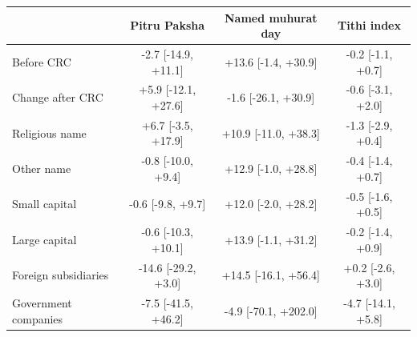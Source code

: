 \begin{tabular}{lccc}
\toprule
 & Pitru Paksha & Named muhurat day & Tithi index \\
\midrule
Before CRC & -2.7 [-14.9, +11.1] & +13.6 [-1.4, +30.9] & -0.2 [-1.1, +0.7] \\
Change after CRC & +5.9 [-12.1, +27.6] & -1.6 [-26.1, +30.9] & -0.6 [-3.1, +2.0] \\
\midrule
Religious name & +6.7 [-3.5, +17.9] & +10.9 [-11.0, +38.3] & -1.3 [-2.9, +0.4] \\
Other name & -0.8 [-10.0, +9.4] & +12.9 [-1.0, +28.8] & -0.4 [-1.4, +0.7] \\
Small capital & -0.6 [-9.8, +9.7] & +12.0 [-2.0, +28.2] & -0.5 [-1.6, +0.5] \\
Large capital & -0.6 [-10.3, +10.1] & +13.9 [-1.1, +31.2] & -0.2 [-1.4, +0.9] \\
\midrule
Foreign subsidiaries & -14.6 [-29.2, +3.0] & +14.5 [-16.1, +56.4] & +0.2 [-2.6, +3.0] \\
Government companies & -7.5 [-41.5, +46.2] & -4.9 [-70.1, +202.0] & -4.7 [-14.1, +5.8] \\
\bottomrule
\end{tabular}
